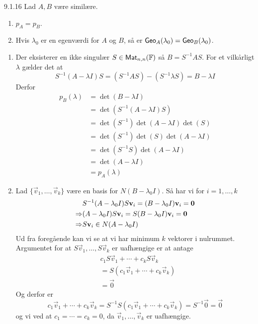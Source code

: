 \begin{lemma}{9.1.16}
	Lad $A, B$ være similære.
	\begin{enumerate}[1.]
		\item $\mathit{p}_A = \mathit{p}_B$.
		\item Hvis $\lambda_0$ er en egenværdi for $A$ og $B$, så er 
			$\textsf{Geo}_{A}(\lambda_0) = \textsf{Geo}_{B}(\lambda_0)$.
	\end{enumerate}
\end{lemma}

\begin{bevis}
	\begin{enumerate}[1.]
		\item Der eksisterer en ikke singulær $S \in \textsf{Mat}_{n,n}(\mathbb{F})$
			så $B = S^{-1}AS$. For et vilkårligt $\lambda$ gælder det at
			\[
				S^{-1}(A- \lambda I)S = (S^{-1}AS) - (S^{-1}\lambda S) = B - \lambda I
			\]
			Derfor
			\begin{align*}
				\mathit{p}_B(\lambda) &= \det(B-\lambda I)\\
				&= \det(S^{-1}(A-\lambda I)S)\\
				&= \det(S^{-1})\det(A-\lambda I)\det(S)\\
				&= \det(S^{-1})\det(S)\det(A - \lambda I)\\
				&= \det(S^{-1}S)\det(A - \lambda I)\\
				&= \det(A - \lambda I)\\
				&= \mathit{p}_A(\lambda)
			\end{align*}
		\item Lad $\{\vec{v}_1, \dotsc, \vec{v}_k\}$ være en basis for 
		$N(B-\lambda_0I)$. Så har vi for $i = 1,\dotsc,k$
		\begin{align*}
			&S^{-1}(A-\lambda_0I)S\mathbf{v}_i = (B-\lambda_0I)\mathbf{v}_i = \mathbf{0}\\
			\Rightarrow &(A-\lambda_0I)S\mathbf{v}_i = S(B-\lambda_0I)\mathbf{v}_i =  \mathbf{0}\\
			\Rightarrow & S\mathbf{v}_i \in N(A-\lambda_0I)
		\end{align*}
		Ud fra foregående kan vi se at vi har minimum $k$ vektorer i nulrummet.
		Argumentet for at $S\vec{v}_1,\dotsc,S\vec{v}_k$ er uafhængige er at 
		antage
		\begin{align*}
			&c_1S\vec{v}_1 + \dotsb + c_kS\vec{v}_k\\
			&= S(c_1\vec{v}_1 + \dotsb + c_k\vec{v}_k)\\
			&= \vec{0}
		\end{align*}
		Og derfor er
		\[
			c_1\vec{v}_1 + \dotsb + c_k\vec{v}_k =
			S^{-1}S(c_1\vec{v}_1 + \dotsb + c_k\vec{v}_k) =
			S^{-1}\vec{0} =
			\vec{0}
		\]
		og vi ved at $c_1= \dotsb =c_k = 0$, da $\vec{v}_1, \dotsc, \vec{v}_k$
		er uafhængige.


\end{enumerate}
\end{bevis}
